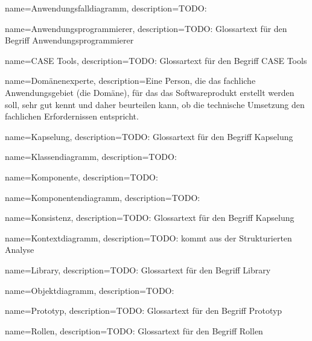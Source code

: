 


{
	name=Anwendungsfalldiagramm,
	description={TODO: }
}

{
    name=Anwendungsprogrammierer,
    description={TODO: Glossartext f\"ur den Begriff Anwendungsprogrammierer}
}

{
    name=CASE Tools,
    description={TODO: Glossartext f\"ur den Begriff CASE Tools}
}

{
    name=Dom\"anenexperte,
    description={Eine Person, die das fachliche Anwendungsgebiet (die Dom\"ane), f\"ur das das Softwareprodukt erstellt werden soll, sehr gut kennt und daher beurteilen kann, ob die technische Umsetzung den fachlichen Erfordernissen entspricht.}
}

{
    name=Kapselung,
    description={TODO: Glossartext f\"ur den Begriff Kapselung}
}

{
	name=Klassendiagramm,
	description={TODO: }
}

{
	name=Komponente,
	description={TODO: }
}

{
	name=Komponentendiagramm,
	description={TODO: }
}

{
    name=Konsistenz,
    description={TODO: Glossartext f\"ur den Begriff Kapselung}
}

{
	name=Kontextdiagramm,
	description={TODO: kommt aus der Strukturierten Analyse}
}

{
    name=Library,
    description={TODO: Glossartext f\"ur den Begriff Library}
}

{
	name=Objektdiagramm,
	description={TODO: }
}

{
	name=Prototyp,
	description={TODO: Glossartext f\"ur den Begriff Prototyp}
}

{
    name=Rollen,
    description={TODO: Glossartext f\"ur den Begriff Rollen}
}

